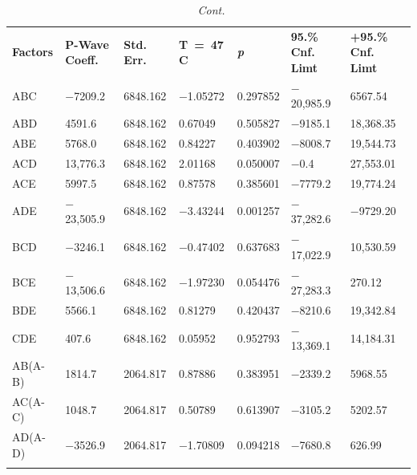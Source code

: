 \documentclass[materials,article,accept,pdftex,moreauthors]{Definitions/mdpi}
\begin{document}
\begin{table}[H]
\begin{tabularx}{\textwidth}{CCCCCCC}
        
      
      
      \bottomrule
     \end{tabularx}
        \end{table}

        
        \begin{table}[H]
        \renewcommand{\arraystretch}{1.3}
        \ContinuedFloat
\caption{{\em~Cont.} \label{tab:1}}
\begin{tabularx}{\textwidth}{CCCCCCC}
\toprule
			\textbf{Factors} & \textbf{P-Wave Coeff. }& \textbf{Std. Err.} & \textbf{T~=~47} \boldmath{$^\circ$}\textbf{C} & \textbf{\emph{{p}}} & \boldmath{$-$}\textbf{95.\%} \textbf{Cnf. Limt} & \textbf{+95.\%}\textbf{ Cnf. Limt} \\  
			   ABC & $-$7209.2 & 6848.162 & $-$1.05272 & 0.297852 & $-$20,985.9 & 6567.54 \\ \midrule
        ABD & 4591.6 & 6848.162 & 0.67049 & 0.505827 & $-$9185.1 & 18,368.35 \\ \midrule
        ABE & 5768.0 & 6848.162 & 0.84227 & 0.403902 & $-$8008.7 & 19,544.73 \\  \midrule			
			ACD & 13,776.3 & 6848.162 & 2.01168 & 0.050007 & $-$0.4 & 27,553.01 \\ \midrule
        ACE & 5997.5 & 6848.162 & 0.87578 & 0.385601 & $-$7779.2 & 19,774.24 \\  
        ADE & $-$23,505.9 & 6848.162 & $-$3.43244 & 0.001257 & $-$37,282.6 & $-$9729.20 \\
        BCD & $-$3246.1 & 6848.162 & $-$0.47402 & 0.637683 & $-$17,022.9 & 10,530.59 \\ \midrule
        BCE & $-$13,506.6 & 6848.162 & $-$1.97230 & 0.054476 & $-$27,283.3 & 270.12 \\ \midrule
        BDE & 5566.1 & 6848.162 & 0.81279 & 0.420437 & $-$8210.6 & 19,342.84 \\ \midrule
        CDE & 407.6 & 6848.162 & 0.05952 & 0.952793 & $-$13,369.1 & 14,184.31 \\ \midrule
        AB(A-B) & 1814.7 & 2064.817 & 0.87886 & 0.383951 & $-$2339.2 & 5968.55 \\ \midrule
        AC(A-C) & 1048.7 & 2064.817 & 0.50789 & 0.613907 & $-$3105.2 & 5202.57 \\ \midrule
        AD(A-D) & $-$3526.9 & 2064.817 & $-$1.70809 & 0.094218 & $-$7680.8 & 626.99 \\  

\end{tabularx}
\end{table}
\end{document}
